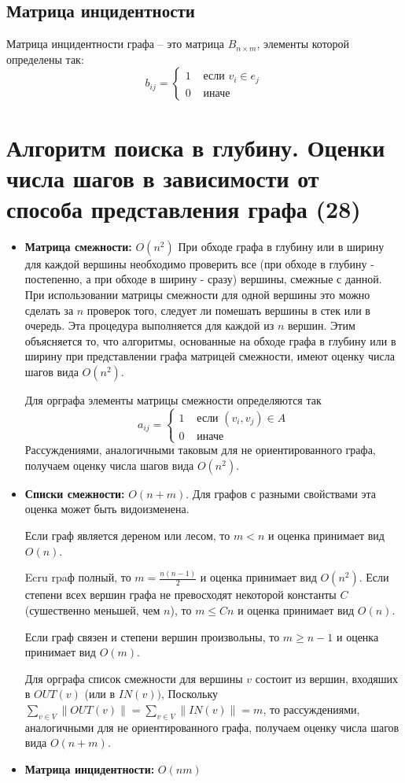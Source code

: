 \documentclass[40pt]{article}
\begin{document}
\subsection{Матрица инцидентности}

Матрица инцидентности графа -- это матрица $B_{n \times m}$, элементы которой определены так:
$$
b_{i j}=\left\{\begin{array}{ll}
1 & \text { если } v_{i} \in e_{j} \\
0 & \text { иначе }
\end{array}\right.
$$

\section{Алгоритм поиска в глубину. Оценки числа шагов в зависимости от способа представления графа (28)}

\begin{itemize}
    \item \textbf{Матрица смежности: } $O\left(n^{2}\right)$
При обходе графа в глубину или в ширину для каждой вершины необходимо проверить все (при обходе в глубину - постепенно, а при обходе в ширину - сразу) вершины, смежные с данной. При использовании матрицы смежности для одной вершины это можно сделать за $n$ проверок того, следует ли помешать вершины в стек или в очередь. Эта процедура выполняется для каждой из $n$ вершин. Этим объясняется то, что алгоритмы, основанные на обходе графа в глубину или в ширину при представлении графа матрицей смежности, имеют оценку числа шагов вида $O\left(n^{2}\right)$.

Для орграфа элементы матрицы смежности определяются так
$$
a_{i j}=\left\{\begin{array}{ll}
1 & \text { если }\left(v_{i}, v_{j}\right) \in A \\
0 & \text { иначе }
\end{array}\right.
$$
Рассуждениями, аналогичными таковым для не ориентированного графа, получаем оценку числа шагов вида $O\left(n^{2}\right)$.

    \item \textbf{Списки смежности: } $O(n+m)$. Для графов с разными свойствами эта оценка может быть видоизменена.

Если граф является дереном или лесом, то $m<n$ и оценка принимает вид $O(n)$.

Ecru rpaф полный, то $m=\frac{n(n-1)}{2}$ и оценка принимает вид $O\left(n^{2}\right)$. Если степени всех вершин графа не превосходят некоторой константы $C$ (сушественно меньшей, чем $n$), то $m \leq C n$ и оценка принимает вид $O(n)$.

Если граф связен и степени вершин произвольны, то $m \geq n-1$ и оценка принимает вид $O(m)$.

Для орграфа список смежности для вершины $v$ состоит из вершин, входяших в $O U T(v)$ (или в $I N(v))$, Поскольку $\sum_{v \in V}\|O U T(v)\|=\sum_{v \in V}\|I N(v)\|=m$, то рассуждениями, аналогичными для не ориентированного графа, получаем оценку числа шагов вида $O(n+m)$.
    \item \textbf{Матрица инцидентности: } $O(n m)$
\end{itemize}
\end{document}
